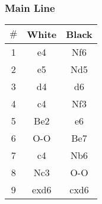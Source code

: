 \documentclass{article}
\newcommand{\smalls}{\par\smallskip}
\begin{document}
        \subsubsection*{Main Line}
        \newgame
        \begin{multicols}{2}
            \showboard
            \smalls
            \begin{tabular}{c|c|c}
            $\#$ & White & Black\\
            \hline
            1 & e4 & Nf6 \\
            2 & e5 & Nd5 \\
            3 & d4 & d6 \\
            4 & c4 & Nf3 \\
            5 & Be2 & e6 \\
            6 & O-O & Be7 \\
            7 & c4 & Nb6 \\
            8 & Nc3 & O-O \\
            9 & exd6 & cxd6 \\
        \end{tabular}
        \end{multicols}
\end{document}

